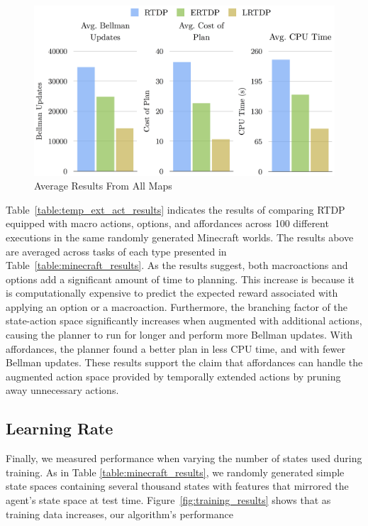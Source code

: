 \documentclass[letterpaper]{article}
\begin{document}
\begin{figure}[t]
\centering
\includegraphics[scale=0.25]{figures/average_results.png}%
  \caption{Average Results From All Maps  \label{fig:average_results}}

\end{figure}


Table~\ref{table:temp_ext_act_results} indicates the results of
comparing RTDP equipped with macro actions, options, and affordances
across 100 different executions in the same randomly generated
Minecraft worlds. The results above are averaged across tasks of each
type presented in Table~\ref{table:minecraft_results}. As the results
suggest, both macroactions and options add a significant amount of
time to planning.  This increase is because it is computationally
expensive to predict the expected reward associated with applying an
option or a macroaction. Furthermore, the branching factor of the
state-action space significantly increases when augmented with
additional actions, causing the planner to run for longer and perform
more Bellman updates. With affordances, the planner found a better
plan in less CPU time, and with fewer Bellman updates. These results
support the claim that affordances can handle the augmented action
space provided by temporally extended actions by pruning away
unnecessary actions.

\subsection{Learning Rate}
Finally, we measured performance when varying the number of states
used during training.  As in Table \ref{table:minecraft_results}, we
randomly generated simple state spaces containing several thousand
states with features that mirrored the agent's state space at test
time.  Figure~\ref{fig:training_results} shows that as training data
increases, our algorithm's performance 
\end{document}
